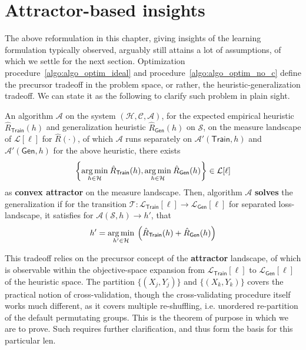\section{Attractor-based insights}

The above reformulation in this chapter, giving insights of the learning formulation typically observed, arguably still attains a lot of assumptions, of which we settle for the next section. Optimization procedure~\ref{algo:algo_optim_ideal} and procedure~\ref{algo:algo_optim_no_c} define the precursor tradeoff in the problem space, or rather, the heuristic-generalization tradeoff. We can state it as the following to clarify such problem in plain sight. 

\begin{theorem}
    An algorithm $\mathcal{A}$ on the system $(\mathcal{H},\mathcal{C},\mathcal{A})$, for the expected empirical heuristic $\hat{R}_{\mathsf{Train}}(h)$ and generalization heuristic $\hat{R}_{\mathsf{Gen}}(h)$ on $\mathcal{S}$, on the measure landscape of $\mathcal{L}[\ell]$ for $\hat{R}(\cdot)$, of which $\mathcal{A}$ runs separately on $\mathcal{A}'(\mathsf{Train},h)$ and $\mathcal{A}'(\mathsf{Gen},h)$ for the above heuristic, there exists \begin{equation}
        \left\{ \underset{h\in \mathcal{H}}{\operatorname*{arg\,min}}\:\hat{R}_{\mathsf{Train}}(h), \underset{h\in \mathcal{H}}{\operatorname*{arg\,min}}\:\hat{R}_{\mathsf{Gen}}(h)\right\}\in \mathcal{L}[\ell]
    \end{equation}
    as \textbf{convex attractor} on the measure landscape. Then, algorithm $\mathcal{A}$ \textbf{solves} the generalization if for the transition $\mathcal{T}:\mathcal{L}_{\mathsf{Train}}[\ell]\to\mathcal{L}_{\mathsf{Gen}}[\ell]$ for separated loss-landscape, it satisfies for $\mathcal{A}(\mathcal{S},h)\to h'$, that 
    \begin{equation}
        h' = \underset{h'\in \mathcal{H}}{\operatorname*{arg\,min}}\: \left(\hat{R}_{\mathsf{Train}}(h) + \hat{R}_{\mathsf{Gen}}(h)\right)
    \end{equation}
\end{theorem}
This tradeoff relies on the precursor concept of the \textbf{attractor} landscape, of which is observable within the objective-space expansion from $\mathcal{L}_{\mathsf{Train}}[\ell]$ to $\mathcal{L}_{\mathsf{Gen}}[\ell]$ of the heuristic space. The partition $\{(X_{j},Y_{j})\}$ and $\{(X_{k},Y_{k})\}$ covers the practical notion of cross-validation, though the cross-validating procedure itself works much different, as it covers multiple re-shuffling, i.e. unordered re-partition of the default permutating groups. This is the theorem of purpose in which we are to prove. Such requires further clarification, and thus form the basis for this particular len. 